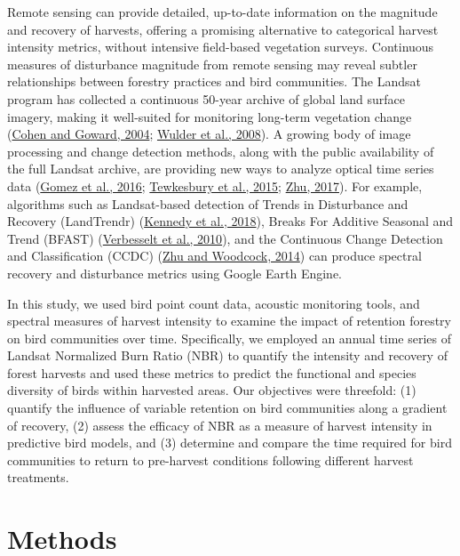 \documentclass[
  12pt,
]{article}
\begin{document}
Remote sensing can provide detailed, up-to-date information on the magnitude and recovery of harvests, offering a promising alternative to categorical harvest intensity metrics, without intensive field-based vegetation surveys. Continuous measures of disturbance magnitude from remote sensing may reveal subtler relationships between forestry practices and bird communities. The Landsat program has collected a continuous 50-year archive of global land surface imagery, making it well-suited for monitoring long-term vegetation change (\protect\hyperlink{ref-cohenLandsatRoleEcological2004}{Cohen and Goward, 2004}; \protect\hyperlink{ref-wulderLandsatContinuityIssues2008}{Wulder et al., 2008}). A growing body of image processing and change detection methods, along with the public availability of the full Landsat archive, are providing new ways to analyze optical time series data (\protect\hyperlink{ref-gomezOpticalRemotelySensed2016}{Gomez et al., 2016}; \protect\hyperlink{ref-tewkesburyCriticalSynthesisRemotely2015}{Tewkesbury et al., 2015}; \protect\hyperlink{ref-zhuChangeDetectionUsing2017a}{Zhu, 2017}). For example, algorithms such as Landsat-based detection of Trends in Disturbance and Recovery (LandTrendr) (\protect\hyperlink{ref-Kennedy2018}{Kennedy et al., 2018}), Breaks For Additive Seasonal and Trend (BFAST) (\protect\hyperlink{ref-verbesseltDetectingTrendSeasonal2010}{Verbesselt et al., 2010}), and the Continuous Change Detection and Classification (CCDC) (\protect\hyperlink{ref-zhuContinuousChangeDetection2014}{Zhu and Woodcock, 2014}) can produce spectral recovery and disturbance metrics using Google Earth Engine.

In this study, we used bird point count data, acoustic monitoring tools, and spectral measures of harvest intensity to examine the impact of retention forestry on bird communities over time. Specifically, we employed an annual time series of Landsat Normalized Burn Ratio (NBR) to quantify the intensity and recovery of forest harvests and used these metrics to predict the functional and species diversity of birds within harvested areas. Our objectives were threefold: (1) quantify the influence of variable retention on bird communities along a gradient of recovery, (2) assess the efficacy of NBR as a measure of harvest intensity in predictive bird models, and (3) determine and compare the time required for bird communities to return to pre-harvest conditions following different harvest treatments.

\hypertarget{methods}{%
\section{Methods}\label{methods}}
\end{document}
